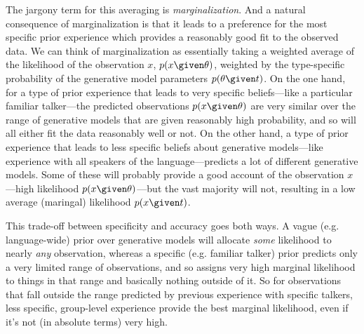 The jargony term for this averaging is \emph{marginalization}. And a natural consequence of marginalization is that it leads to a preference for the most specific prior experience which provides a reasonably good fit to the observed data.  We can think of marginalization as essentially taking a weighted average of the likelihood of the observation $x$, $p(x \given \theta)$, weighted by the type-specific probability of the generative model parameters $p(\theta \given t)$.  On the one hand, for a type of prior experience that leads to very specific beliefs---like a particular familiar talker---the predicted observations $p(x\given \theta)$ are very similar over the range of generative models that are given reasonably high probability, and so will all either fit the data reasonably well or not.  On the other hand, a type of prior experience that leads to less specific beliefs about generative models---like experience with all speakers of the language---predicts a lot of different generative models.  Some of these will probably provide a good account of the observation $x$---high likelihood $p(x \given \theta)$---but the vast majority will not, resulting in a low average (maringal) likelihood $p(x \given t)$. 

This trade-off between specificity and accuracy goes both ways.  A vague (e.g. language-wide) prior over generative models will allocate \emph{some} likelihood to nearly \emph{any} observation, whereas a specific (e.g. familiar talker) prior predicts only a very limited range of observations, and so assigns very high marginal likelihood to things in that range and basically nothing outside of it.  So for observations that fall outside the range predicted by previous experience with specific talkers, less specific, group-level experience provide the best marginal likelihood, even if it's not (in absolute terms) very high.  

